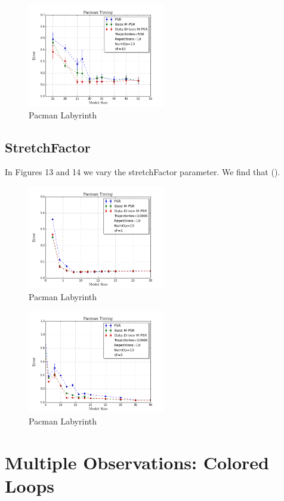 \begin{figure}[ht!]
\centering
\includegraphics[width=60mm]{uCOREPICS/Pacman/Pacman500.png}
\caption{Pacman Labyrinth\label{overflow}}
\end{figure}

\subsection{StretchFactor}

In Figures 13 and 14 we vary the stretchFactor parameter. We find that ().

\begin{figure}[ht!]
\centering
\includegraphics[width=60mm]{uCOREPICS/Pacman/PacmanSF=1.png}
\caption{Pacman Labyrinth\label{overflow}}
\end{figure}

\begin{figure}[ht!]
\centering
\includegraphics[width=60mm]{uCOREPICS/Pacman/PacmanSF=5.png}
\caption{Pacman Labyrinth\label{overflow}}
\end{figure}

\section{Multiple Observations: Colored Loops}

